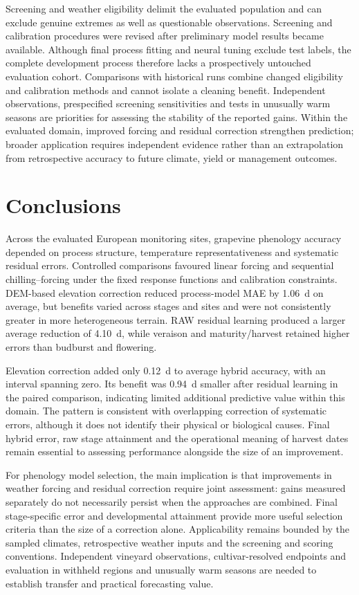 \documentclass[a4paper,12pt]{article}
\let\OriginalSection\section
\renewcommand{\section}{\FloatBarrier\OriginalSection}
\begin{document}
Screening and weather eligibility delimit the evaluated population and can exclude genuine extremes as well as questionable observations. Screening and calibration procedures were revised after preliminary model results became available. Although final process fitting and neural tuning exclude test labels, the complete development process therefore lacks a prospectively untouched evaluation cohort. Comparisons with historical runs combine changed eligibility and calibration methods and cannot isolate a cleaning benefit. Independent observations, prespecified screening sensitivities and tests in unusually warm seasons are priorities for assessing the stability of the reported gains. Within the evaluated domain, improved forcing and residual correction strengthen prediction; broader application requires independent evidence rather than an extrapolation from retrospective accuracy to future climate, yield or management outcomes.

\section{Conclusions}

Across the evaluated European monitoring sites, grapevine phenology accuracy depended on process structure, temperature representativeness and systematic residual errors. Controlled comparisons favoured linear forcing and sequential chilling--forcing under the fixed response functions and calibration constraints. DEM-based elevation correction reduced process-model MAE by 1.06~d on average, but benefits varied across stages and sites and were not consistently greater in more heterogeneous terrain. RAW residual learning produced a larger average reduction of 4.10~d, while veraison and maturity/harvest retained higher errors than budburst and flowering.

Elevation correction added only 0.12~d to average hybrid accuracy, with an interval spanning zero. Its benefit was 0.94~d smaller after residual learning in the paired comparison, indicating limited additional predictive value within this domain. The pattern is consistent with overlapping correction of systematic errors, although it does not identify their physical or biological causes. Final hybrid error, raw stage attainment and the operational meaning of harvest dates remain essential to assessing performance alongside the size of an improvement.

For phenology model selection, the main implication is that improvements in weather forcing and residual correction require joint assessment: gains measured separately do not necessarily persist when the approaches are combined. Final stage-specific error and developmental attainment provide more useful selection criteria than the size of a correction alone. Applicability remains bounded by the sampled climates, retrospective weather inputs and the screening and scoring conventions. Independent vineyard observations, cultivar-resolved endpoints and evaluation in withheld regions and unusually warm seasons are needed to establish transfer and practical forecasting value.
\end{document}
